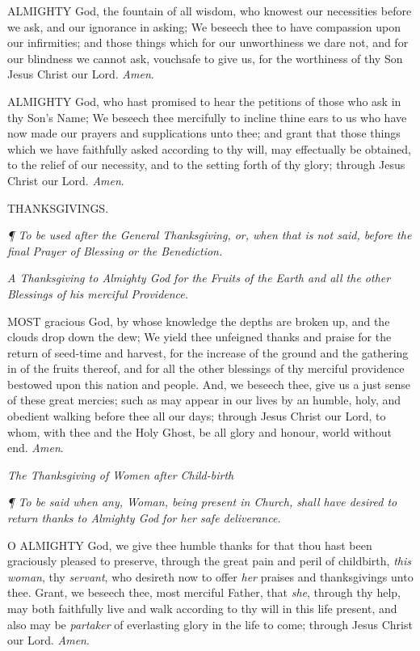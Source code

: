 ALMIGHTY
God, the fountain of all wisdom, who knowest our necessities before we
ask, and our ignorance in asking; We beseech thee to have compassion upon
our infirmities; and those things which for our unworthiness we dare not,
and for our blindness we cannot ask, vouchsafe to give us, for the worthiness
of thy Son Jesus Christ our Lord. \emph{Amen}.

ALMIGHTY
God, who hast promised to hear the petitions of those who ask in thy Son’s
Name; We beseech thee mercifully to incline thine ears to us who have
now made our prayers and supplications unto thee; and grant that those
things which we have faithfully asked according to thy will, may effectually
be obtained, to the relief of our necessity, and to the setting forth
of thy glory; through Jesus Christ our Lord. \emph{Amen}.

THANKSGIVINGS.

\emph{¶
To be used after the General Thanksgiving, or, when that is not said,
before the final Prayer of Blessing or the Benediction.}

\emph{A Thanksgiving
to Almighty God for the Fruits of the Earth and all the other Blessings
of his merciful Providence.}

MOST
gracious God, by whose knowledge the depths are broken up, and the clouds
drop down the dew; We yield thee unfeigned thanks and praise for the return
of seed-time and harvest, for the increase of the ground and the gathering
in of the fruits thereof, and for all the other blessings of thy merciful
providence bestowed upon this nation and people. And, we beseech thee,
give us a just sense of these great mercies; such as may appear in our
lives by an humble, holy, and obedient walking before thee all our days;
through Jesus Christ our Lord, to whom, with thee and the Holy Ghost,
be all glory and honour, world without end. \emph{Amen}.

\emph{The
Thanksgiving of Women after Child-birth}

\emph{¶
To be said when any, Woman, being present in Church, shall have desired
to return thanks to Almighty God for her safe deliverance.}

O
ALMIGHTY God, we give thee humble thanks for that thou hast been graciously
pleased to preserve, through the great pain and peril of childbirth, \emph{this
woman}, thy \emph{servant}, who desireth now to offer \emph{her}
praises and thanksgivings unto thee. Grant, we beseech thee, most merciful
Father, that \emph{she}, through thy help, may both faithfully live
and walk according to thy will in this life present, and also may be \emph{partaker}
of everlasting glory in the life to come; through Jesus Christ our Lord.
\emph{Amen}.


